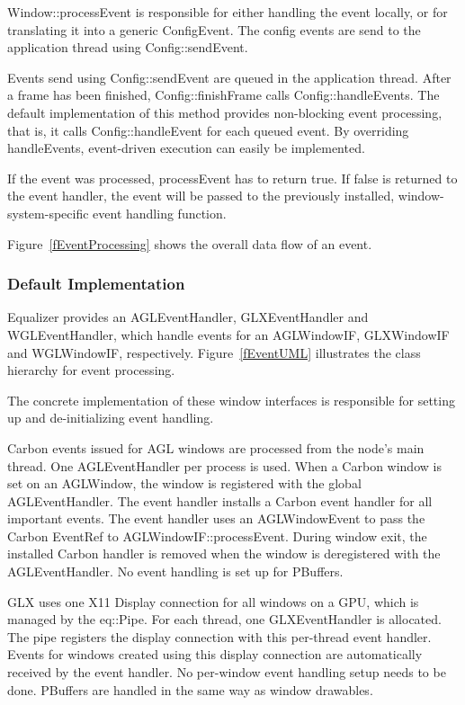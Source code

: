 \documentclass[10pt,a4]{scrartcl}
\newcommand{\fig}[1]{Figure~\ref{#1}}
\begin{document}
\textsf{Window::processEvent} is responsible for either handling
the event locally, or for translating it into a generic
\textsf{ConfigEvent}. The config events are send to the application
thread using \textsf{Config::sendEvent}. 

Events send using \textsf{Config::sendEvent} are queued in the
application thread. After a frame has been finished,
\textsf{Config::finishFrame} calls \textsf{Config::handleEvents}. The
default implementation of this method provides non-blocking event
processing, that is, it calls \textsf{Config::handleEvent} for each
queued event. By overriding \textsf{handleEvents}, event-driven
execution can easily be implemented.

If the event was processed, \textsf{processEvent} has to return
\textsf{true}. If \textsf{false} is returned to the event handler, the
event will be passed to the previously installed, window-system-specific
event handling function.

\fig{fEventProcessing} shows the overall data flow of an event.

\subsubsection{Default Implementation}

Equalizer provides an \textsf{AGLEvent\-Handler},
\textsf{GLXEventHandler} and \textsf{WGL\-Event\-Handler}, which handle
events for an \textsf{AGLWindowIF}, \textsf{GLXWindowIF} and
\textsf{WGLWindowIF}, respectively. \fig{fEventUML} illustrates the
class hierarchy for event processing.

The concrete implementation of these window interfaces is responsible
for setting up and de-initializing event handling.

Carbon events issued for AGL windows are processed from the node's main
thread. One \textsf{AGLEventHandler} per process is used. When a Carbon
window is set on an \textsf{AGLWindow}, the window is registered with
the global \textsf{AGLEventHandler}. The event handler installs a Carbon
event handler for all important events. The event handler uses an
\textsf{AGLWindowEvent} to pass the Carbon \textsf{EventRef} to
\textsf{AGLWindowIF::processEvent}. During window exit, the installed
Carbon handler is removed when the window is deregistered with the
\textsf{AGLEventHandler}. No event handling is set up for PBuffers.

GLX uses one X11 Display connection for all windows on a GPU, which is
managed by the \textsf{eq::Pipe}. For each thread, one
\textsf{GLXEventHandler} is allocated. The pipe registers the display
connection with this per-thread event handler. Events for windows
created using this display connection are automatically received by the
event handler. No per-window event handling setup needs to be
done. PBuffers are handled in the same way as window drawables.
\end{document}
